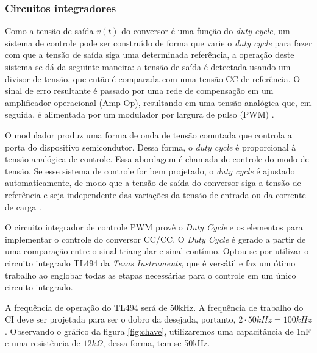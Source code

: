 \subsubsection*{Circuitos integradores}

Como a tensão de saída $v(t)$ do conversor é uma função do \textit{duty cycle}, um sistema de controle pode ser construído de forma que varie o \textit{duty cycle} para fazer com que a tensão de saída siga uma determinada referência, a operação deste sistema se dá da seguinte maneira: a tensão de saída é detectada usando um divisor de tensão, que então é comparada com uma tensão CC de referência. O sinal de erro resultante é passado por uma rede de compensação em um amplificador operacional (Amp-Op), resultando em uma tensão analógica que, em seguida, é alimentada por um modulador por largura de pulso (PWM) \cite{forward}.

O modulador produz uma forma de onda de tensão comutada que controla a porta do dispositivo semicondutor. Dessa forma, o \textit{duty cycle} é proporcional à tensão analógica de controle. Essa abordagem é chamada de controle do modo de tensão. Se esse sistema de controle for bem projetado, o \textit{duty cycle} é ajustado automaticamente, de modo que a tensão de saída do conversor siga a tensão de referência e seja independente das variações da tensão de entrada ou da corrente de carga \cite{forward}.

O circuito integrador de controle PWM provê o \textit{Duty Cycle} e os elementos para implementar o controle do conversor CC/CC. O \textit{Duty Cycle} é gerado a partir de uma comparação entre o sinal triangular e sinal contínuo. Optou-se por utilizar o circuito integrado TL494 da \textit{Texas Instruments}, que é versátil e faz um ótimo trabalho ao englobar todas as etapas necessárias para o controle em um único circuito integrado.

A frequência de operação do TL494 será de 50kHz. A frequência de trabalho do CI deve ser projetada para ser o dobro da desejada, portanto, $2 \cdot 50kHz = 100kHz$. Observando o gráfico da figura \ref{fig:chave}, utilizaremos uma capacitância de 1nF e uma resistência de $12k\Omega$, dessa forma, tem-se 50kHz. 

